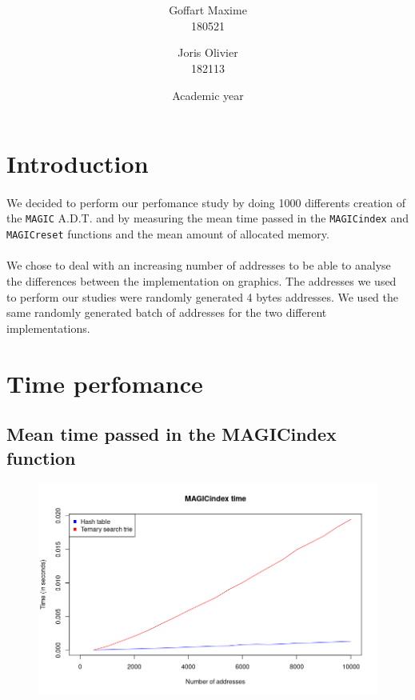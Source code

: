 \documentclass[a4paper, 11pt, oneside]{article}
\title{\ClassName\\\vspace*{0.8cm}\ProjectName\vspace{0.8cm}}
\author{Goffart Maxime \\180521 \and Joris Olivier \\ 182113}
\date{\vspace{1cm}Academic year \AcademicYear}
\begin{document}
\begin{titlingpage}
{\let\newpage\relax\maketitle}
\end{titlingpage}

\section{Introduction}
\paragraph{}We decided to perform our perfomance study by doing 1000 differents creation of the \texttt{MAGIC} A.D.T. and by measuring the mean time passed in the \texttt{MAGICindex} and \texttt{MAGICreset} functions and the mean amount of allocated memory. 
\paragraph{}We chose to deal with an increasing number of addresses to be able to analyse the differences between the implementation on graphics. The addresses we used to perform our studies were randomly generated 4 bytes addresses. We used the same randomly generated batch of addresses for the two different implementations.

\section{Time perfomance}

\subsection{Mean time passed in the MAGICindex function}

\begin{figure}[H]
  \centering
  \includegraphics[scale=.6]{plots/index.png}
\end{figure}
\end{document}
